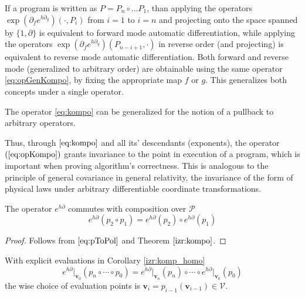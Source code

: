 \documentclass[11pt]{article}
\newcommand{\VV}{\mathcal{V}}
\newcommand{\vv}{\mathbf{v}}
\newcommand{\dP}{\mathcal{P}}
\newcommand{\D}{\partial}
\begin{document}
  \begin{remark}[Unified AD]\label{trd:reverseForward}
  If a program is written as $P=P_n\circ\ldots P_1$, than applying the operators
  $\exp(\D_fe^{h\D_g})(\cdot,P_i)$ from $i=1$ to $i=n$ and projecting onto the space
  spanned by $\{1,\D\}$ is equivalent to forward mode automatic differentiation,
  while applying the 
  operators $\exp(\D_fe^{h\D_g})(P_{n-i+1},\cdot)$ in reverse order (and
  projecting) is equivalent to reverse mode automatic differentiation.
  Both forward and reverse mode (generalized to arbitrary order)
  are obtainable using the same operator \eqref{eq:opGenKompo}, by fixing the
  appropriate map $f$ or $g$. This generalizes both concepts under a single operator.
 \end{remark}
 
  \begin{remark}
  The operator \eqref{eq:kompo} can be generalized for the notion of a pullback
  to arbitrary operators. 
  \end{remark}
 
 Thus, through $\eqref{eq:kompo}$ and all its' descendants (exponents), the
 operator $(\ref{eq:opKompo})$ grants invariance to the point in execution of a
 program, which is important when proving algorithm's correctness. This is
 analogous to the principle of general covariance \citep[see
 section 7.1 in a book by][]{GeneralCovariance} in general relativity, the invariance of the form of physical laws
 under arbitrary differentiable coordinate transformations. 
 
 
   \begin{corollary}\label{izr:komp_homo}
   The operator $e^{h\D}$ commutes with composition over $\dP$
   \begin{equation*}
   e^{h\D}(p_2\circ p_1)=e^{h\D}(p_2)\circ e^{h\D}(p_1)
   \end{equation*}
   \end{corollary}
   
   \begin{proof}
   Follows from $\eqref{eq:pToPol}$ and Theorem $\ref{izr:kompo}$.
   \end{proof}
   
   \begin{remark}
   With explicit evaluations in Corollary \ref{izr:komp_homo}
   \begin{equation*}
   e^{h\D}\vert_{\vv_0}(p_n\circ\cdots\circ p_0)=e^{h\D}\vert_{\vv_n}(p_n)\circ\cdots\circ e^{h\D}\vert_{\vv_0}(p_0)
   \end{equation*}
   the wise choice of evaluation points is $\vv_{i}=p_{i-1}(\vv_{i-1})\in \VV$.
   \end{remark}
\end{document}

